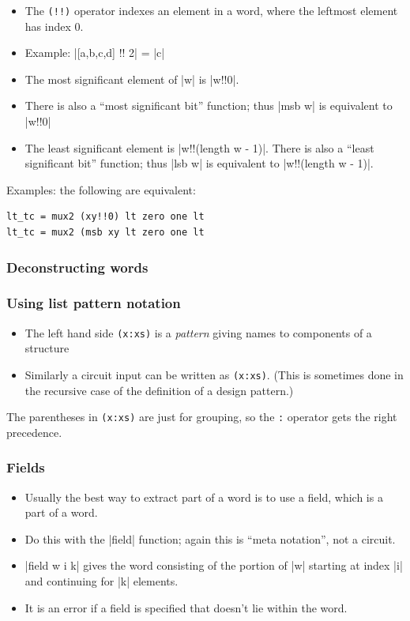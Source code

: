 \documentclass[]{svmono}
\begin{document}
\begin{itemize}
\item The \texttt{(!!)} operator indexes an element in a word, where
the leftmost element has index 0.
\item Example: |[a,b,c,d] !! 2| = |c|
\item The most significant element of |w| is |w!!0|.
\item There is also a ``most significant bit'' function; thus |msb w|
is equivalent to |w!!0|
\item The least significant element is |w!!(length w - 1)|.  There is
also a ``least significant bit'' function; thus |lsb w| is equivalent
to |w!!(length w - 1)|.
\end{itemize}

Examples: the following are equivalent:

\begin{verbatim}
lt_tc = mux2 (xy!!0) lt zero one lt
lt_tc = mux2 (msb xy lt zero one lt
\end{verbatim}
\subsubsection*{Deconstructing words}
\label{sec:orgfbebb49}
\subsubsection*{Using list pattern notation}
\label{sec:orga6b45bb}

\begin{itemize}
\item The left hand side \texttt{(x:xs)} is a \emph{pattern} giving
names to components of a structure
\item Similarly a circuit input can be written as \texttt{(x:xs)}.
(This is sometimes done in the recursive case of the definition
of a design pattern.)
\end{itemize}

The parentheses in \texttt{(x:xs)} are just for grouping, so the
\texttt{:} operator gets the right precedence.
\subsubsection*{Fields}
\label{sec:orgf65a21a}

\begin{itemize}
\item Usually the best way to extract part of a word is to use a
\alert{field}, which is a part of a word.
\item Do this with the |field| function; again this is ``meta
notation'', not a circuit.
\item |field w i k| gives the word consisting of the portion of |w|
starting at index |i| and continuing for |k| elements.
\item It is an error if a field is specified that doesn't lie within
the word.
\end{itemize}
\end{document}
